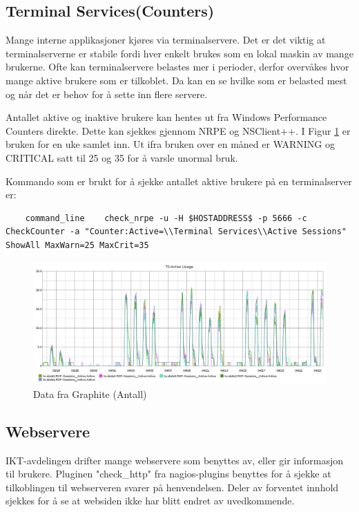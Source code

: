 \subsection{Terminal Services(Counters)}
Mange interne applikasjoner kjøres via terminalservere. Det er det viktig at terminalserverne er stabile fordi hver enkelt brukes som en lokal maskin av mange brukerne. Ofte kan terminalservere belastes mer i perioder, derfor overvåkes hvor mange aktive brukere som er tilkoblet. Da kan en se hvilke som er belasted mest og når det er behov for å sette inn flere servere.

Antallet aktive og inaktive brukere kan hentes ut fra Windows Performance Counters direkte. Dette kan sjekkes gjennom NRPE og NSClient++. I Figur \ref{ts-skole-usage} er bruken for en uke samlet inn. Ut ifra bruken over en måned er WARNING og CRITICAL satt til 25 og 35 for å varsle unormal bruk.

Kommando som er brukt for å sjekke antallet aktive brukere på en terminalserver er:
 
\begin{lstlisting}
	command_line	check_nrpe -u -H $HOSTADDRESS$ -p 5666 -c CheckCounter -a "Counter:Active=\\Terminal Services\\Active Sessions" ShowAll MaxWarn=25 MaxCrit=35
\end{lstlisting}

\begin{figure}[H]
	\centering
	\includegraphics[width=1.0\textwidth]{img/ts-skole-usage-inv}
	\caption{Data fra Graphite (Antall)}
	\label{ts-skole-usage}
\end{figure}

\subsection{Webservere}
IKT-avdelingen drifter mange webservere som benyttes av, eller gir informasjon til brukere. Pluginen "check\_http" \cite{checkhttp} fra nagios-plugins benyttes for å sjekke at tilkoblingen til webserveren svarer på henvendelsen. Deler av forventet innhold sjekkes for å se at websiden ikke har blitt endret av uvedkommende.

